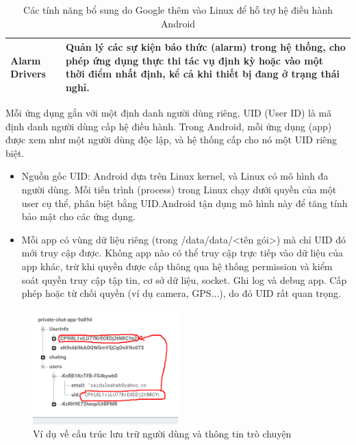 \begin{flushleft}
\begin{table}[H]
\begin{tabular}{|p{3.5cm}|p{12cm}|}
            \hline
            Alarm Drivers & Quản lý các sự kiện báo thức (alarm) trong hệ thống, cho phép ứng dụng thực thi tác vụ định kỳ hoặc vào một thời điểm nhất định, kể cả khi thiết bị đang ở trạng thái nghỉ. \\
            \hline
        \end{tabular}
        \caption{Các tính năng bổ sung do Google thêm vào Linux để hỗ trợ hệ điều hành Android}
        \label{table:android-linux-features}
        \end{table}          
\end{flushleft}

\renewcommand{\labelitemi}{--}    
    \begin{flushleft}
        \hspace*{0.8cm}Mỗi ứng dụng gắn với một định danh người dùng riêng. UID (User ID) là mã định danh người dùng cấp hệ điều hành. Trong Android, mỗi ứng dụng (app) được xem như một người dùng độc lập, và hệ thống cấp cho nó một UID riêng biệt.
        \setlength{\leftmargini}{1.5cm}
        \begin{itemize}
            \item Nguồn gốc UID: Android dựa trên Linux kernel, và Linux có mô hình đa người dùng. Mỗi tiến trình (process) trong Linux chạy dưới quyền của một user cụ thể, phân biệt bằng UID.Android tận dụng mô hình này để tăng tính bảo mật cho các ứng dụng.
            \item Mỗi app có vùng dữ liệu riêng (trong /data/data/<tên gói>) mà chỉ UID đó mới truy cập được. Không app nào có thể truy cập trực tiếp vào dữ liệu của app khác, trừ khi quyền được cấp thông qua hệ thống permission và kiểm soát quyền truy cập tập tin, cơ sở dữ liệu, socket. Ghi log và debug app. Cấp phép hoặc từ chối quyền (ví dụ camera, GPS...), do đó UID rất quan trọng.
        \end{itemize}

        \begin{figure}[H] 
            \centering
            \includegraphics[width=0.5\textwidth]{images/uid.png}
            \caption{Ví dụ về cấu trúc lưu trữ người dùng và thông tin trò chuyện}
            \label{fig:android}
        \end{figure}
    \end{flushleft}

